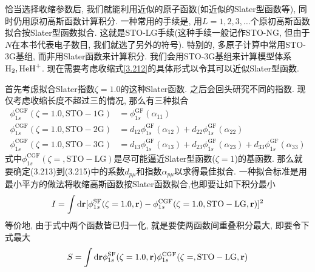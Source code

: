 恰当选择收缩参数后, 我们就能利用近似的原子\hft 函数(如近似的Slater型函数等), 同时仍用原初高斯函数计算积分. 一种常用的手续是, 用$L=1,2,3,\ldots$个原初高斯函数拟合按Slater型函数拟合. 这就是STO-LG手续(这种手续一般记作STO-NG, 但由于$N$在本书代表电子数目, 我们就选了另外的符号). 特别的, 多原子计算中常用STO-3G基组, 而非用Slater函数来计算积分. 我们会用STO-3G基组来计算模型体系$\mathrm{H}_2,\mathrm{HeH}^+$. 现在需要考虑收缩式\eqref{3.212}的具体形式以令其可以近似Slater型函数.

首先考虑拟合Slater指数$\zeta=1.0$的这种Slater函数. 之后会回头研究不同的指数. 现仅考虑收缩长度不超过三的情况, 那么有三种拟合
\begin{align}
\phi_{1s}^\mathrm{CGF}(\zeta=1.0, \mathrm{STO-1G}) &= \phi_{1s}^\mathrm{GF}(\alpha_{11})\\
\phi_{1s}^\mathrm{CGF}(\zeta=1.0, \mathrm{STO-2G}) &= d_{12}\phi_{1s}^\mathrm{GF}(\alpha_{12}) + d_{22}\phi_{1s}^\mathrm{GF}(\alpha_{22})\\
\phi_{1s}^\mathrm{CGF}(\zeta=1.0, \mathrm{STO-3G}) &= d_{13}\phi_{1s}^\mathrm{GF}(\alpha_{13}) + d_{23}\phi_{1s}^\mathrm{GF}(\alpha_{23}) + d_{33}\phi_{1s}^\mathrm{GF}(\alpha_{33})
\end{align}
式中$\phi_{1s}^\mathrm{CGF}(\zeta=, \mathrm{STO-LG})$是尽可能逼近Slater型函数($\zeta=1$)的基函数. 那么就要确定(3.213)到(3.215)中的系数$d_{p\mu}$和指数$\alpha_{p\mu}$以求得最佳拟合. 一种拟合标准是用最小平方的做法将收缩高斯函数按Slater函数拟合,也即要让如下积分最小
\begin{align}
I = \int\dd{r}[\phi_{1s}^\mathrm{SF}(\zeta=1.0,\bfr) - \phi_{1s}^\mathrm{CGF}(\zeta=1.0, \mathrm{STO-LG},\bfr)]^2
\end{align}
等价地, 由于式中两个函数皆已归一化, 就是要使两函数间重叠积分最大, 即要令下式最大
\begin{align}
S = \int\dd{r}\phi_{1s}^\mathrm{SF}(\zeta=1.0,\bfr)\phi_{1s}^\mathrm{CGF}(\zeta=, \mathrm{STO-LG},\bfr)
\end{align}

